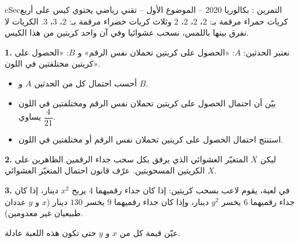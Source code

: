 \documentclass[12pt,a4paper]{article}
\newenvironment{BOX}[2]{\begin{otherlanguage}{english}\begin{arbox}{#1}{#2}}{\end{arbox}\end{otherlanguage}}
\newcounter{exo}
\newenvironment{tamrin}[1]{\stepcounter{exo}\begin{BOX}{cSec}{التمرين \theexo: #1}}{\end{BOX}}
\newenvironment{sq}{\begin{itemize}[leftmargin=2.4em,itemsep=3pt]}{\end{itemize}}
\newcommand{\qa}{\item[(أ)]}\newcommand{\qb}{\item[(ب)]}\newcommand{\qc}{\item[(جـ)]}\newcommand{\qd}{\item[(د)]}\newcommand{\qe}{\item[(هـ)]}
\newcommand{\QQ}[1]{\par\smallskip\textbf{#1.} }
\begin{document}
\begin{tamrin}{بكالوريا 2020 -- الموضوع الأول -- تقني رياضي}
يحتوي كيس على أربع كريات حمراء مرقمة بـ: $2$، $2$، $2$، $2$ وثلاث كريات خضراء مرقمة بـ: $2$، $3$، $3$. الكريات لا نفرق بينها باللمس، نسحب عشوائيا وفي آن واحد كريتين من هذا الكيس.
\QQ{1} نعتبر الحدثين: $A$: «الحصول على كريتين تحملان نفس الرقم» و $B$: «الحصول على كريتين مختلفتين في اللون».
\begin{sq}
\qa أحسب احتمال كل من الحدثين $A$ و $B$.
\qb بيّن أن احتمال الحصول على كريتين تحملان نفس الرقم ومختلفتين في اللون يساوي $\dfrac{4}{21}$.
\qc استنتج احتمال الحصول على كريتين تحملان نفس الرقم أو مختلفتين في اللون.
\end{sq}
\QQ{2} ليكن $X$ المتغيّر العشوائي الذي يرفق بكل سحب جداء الرقمين الظاهرين على الكريتين المسحوبتين. عرّف قانون احتمال المتغيّر العشوائي $X$.
\QQ{3} في لعبة، يقوم لاعب بسحب كريتين: إذا كان جداء رقميهما $4$ يربح $x^2$ دينار، إذا كان جداء رقميهما $6$ يخسر $y^2$ دينار، وإذا كان جداء رقميهما $9$ يخسر $130$ دينار ($x$ و $y$ عددان طبيعيان غير معدومين).

عيّن قيمة كل من $x$ و $y$ حتى تكون هذه اللعبة عادلة.
\end{tamrin}
\end{document}
